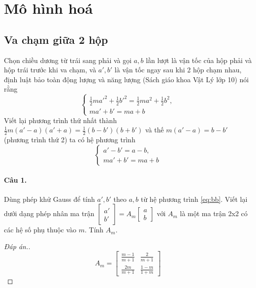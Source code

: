 \documentclass[11pt]{article}
\begin{document}
\section*{Mô hình hoá}
\label{sec:org93c7835}
\subsection*{Va chạm giữa 2 hộp}
\label{sec:orgf5375ad}

Chọn chiều dương từ trái sang phải và gọi \(a,b\) lần lượt là vận tốc của hộp phải và
hộp trái trước khi va chạm, và \(a', b'\) là vận tốc ngay sau khi 2 hộp chạm nhau, định luật bảo toàn động lượng và
năng lượng (Sách giáo khoa Vật Lý lớp 10) nói rằng
\begin{equation*}
 \begin{cases}
\frac{1}{2}ma'^2 + \frac{1}{2}b'^2 = \frac{1}{2}ma^2 + \frac{1}{2}b^2,  \\
ma' + b' = ma + b
 \end{cases}
\end{equation*}
Viết lại phương trình thứ nhất thành \(\frac{1}{2}m(a' - a)(a'+a) =
\frac{1}{2}(b-b')(b+b')\) và thế \(m(a'-a) = b-b'\) (phương trình thứ 2)
ta có hệ phương trình
\begin{equation}
\label{eq:bb}
 \begin{cases}
a'-b' = a-b,  \\
ma' + b' = ma + b
 \end{cases}
\end{equation}


\paragraph{Câu 1.}
\label{sec:orgdba3652}
Dùng phép khử Gauss để tính \(a', b'\) theo \(a, b\) từ hệ phương trình
\eqref{eq:bb}. Viết lại dưới dạng phép nhân ma trận \(\begin{bmatrix} a'
\\ b' \end{bmatrix} = A_m  \begin{bmatrix} a
\\ b \end{bmatrix}\) với \(A_m\) là một ma trận 2x2 có các hệ số phụ thuộc vào \(m\). Tính \(A_m\).
\begin{proof}[Đáp án.]
\[
A_m =  \begin{bmatrix} \frac{m-1}{m+1} & \frac{2}{m+1}\\ \frac{2m}{m+1} &
\frac{1-m}{1+m} \end{bmatrix}
\]
\end{proof}
\end{document}
